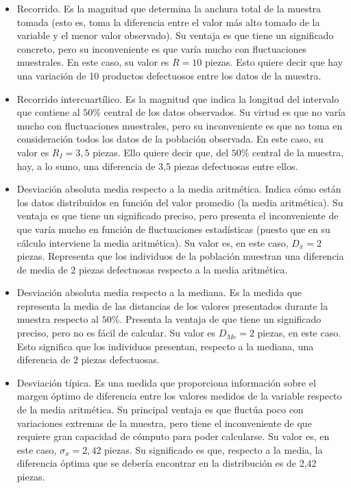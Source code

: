 \begin{itemize}
	
	\item Recorrido. Es la magnitud que determina la anchura total de la muestra tomada (esto es, toma la diferencia entre el valor más alto tomado de la variable y el menor valor observado). Su ventaja es que tiene un significado concreto, pero su inconveniente es que varía mucho con fluctuaciones muestrales. En este caso, su valor es $R = 10$ piezas. Esto quiere decir que hay una variación de 10 productos defectuosos entre los datos de la muestra.
	
	\item Recorrido intercuartílico. Es la magnitud que indica la longitud del intervalo que contiene al $50\%$ central de los datos observados. Su virtud es que no varía mucho con fluctuaciones muestrales, pero su inconveniente es que no toma en consideración todos los datos de la población observada. En este caso, su valor es $R_{I} = 3,5$ piezas. Ello quiere decir que, del $50\%$ central de la muestra, hay, a lo sumo, una diferencia de 3,5 piezas defectuosas entre ellos.
	
	\item Desviación absoluta media respecto a la media aritmética. Indica cómo están los datos distribuidos en función del valor promedio (la media aritmética). Su ventaja es que tiene un significado preciso, pero presenta el inconveniente de que varía mucho en función de fluctuaciones estadísticas (puesto que en su cálculo interviene la media aritmética). Su valor es, en este caso, $D_{\bar x} = 2$ piezas. Representa que los individuos de la población muestran una diferencia de media de 2 piezas defectuosas respecto a la media aritmética.
	
	\item Desviación absoluta media respecto a la mediana. Es la medida que representa la media de las distancias de los valores presentados durante la muestra respecto al $50\%$. Presenta la ventaja de que tiene un significado preciso, pero no es fácil de calcular. Su valor es $D_{Me} = 2$ piezas, en este caso. Esto significa que los individuos presentan, respecto a la mediana, una diferencia de 2 piezas defectuosas.
	
	\item Desviación típica. Es una medida que proporciona información sobre el margen óptimo de diferencia entre los valores medidos de la variable respecto de la media aritmética. Su principal ventaja es que fluctúa poco con variaciones extremas de la muestra, pero tiene el inconveniente de que requiere gran capacidad de cómputo para poder calcularse. Su valor es, en este caso, $\sigma_{x} = 2,42$ piezas. Su significado es que, respecto a la media, la diferencia óptima que se debería encontrar en la distribución es de 2,42 piezas.
	

\end{itemize}

